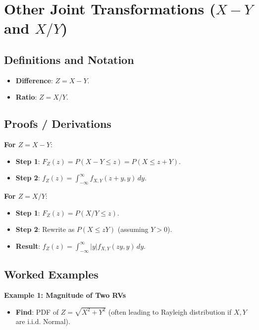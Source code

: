 \documentclass[11pt]{article}
\begin{document}
\section{Other Joint Transformations ($X-Y$ and $X/Y$)}

\subsection{Definitions and Notation}
\begin{itemize}
    \item \textbf{Difference}: $Z = X - Y$.
    \item \textbf{Ratio}: $Z = X/Y$.
\end{itemize}

\subsection{Proofs / Derivations}
\textbf{For $Z = X - Y$}:
\begin{itemize}
    \item \textbf{Step 1}: $F_Z(z) = P(X-Y \leq z) = P(X \leq z+Y)$.
    \item \textbf{Step 2}: $f_Z(z) = \int_{-\infty}^{\infty} f_{X,Y}(z+y, y) \, dy$.
\end{itemize}

\textbf{For $Z = X/Y$}:
\begin{itemize}
    \item \textbf{Step 1}: $F_Z(z) = P(X/Y \leq z)$.
    \item \textbf{Step 2}: Rewrite as $P(X \leq zY)$ (assuming $Y > 0$).
    \item \textbf{Result}: $f_Z(z) = \int_{-\infty}^{\infty} |y| f_{X,Y}(zy, y) \, dy$.
\end{itemize}

\subsection{Worked Examples}
\textbf{Example 1: Magnitude of Two RVs}
\begin{itemize}
    \item \textbf{Find}: PDF of $Z = \sqrt{X^2 + Y^2}$ (often leading to Rayleigh distribution if $X,Y$ are i.i.d. Normal).
\end{itemize}
\end{document}
